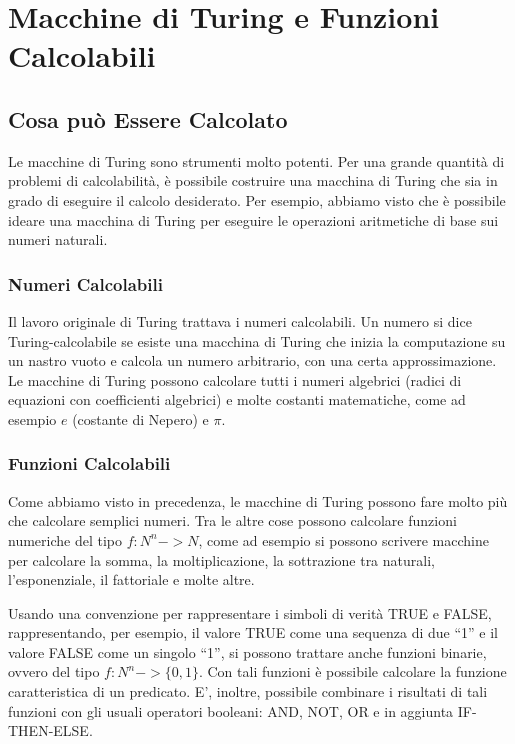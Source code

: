 \chapter{Macchine di Turing e Funzioni Calcolabili}

\section{Cosa pu\`o Essere Calcolato}

Le macchine di Turing sono strumenti molto potenti. Per una grande
quantit\`a di problemi di calcolabilit\`a, \`e possibile costruire una
macchina di Turing che sia in grado di eseguire il calcolo
desiderato. Per esempio, abbiamo visto che \`e possibile ideare una
macchina di Turing per eseguire le operazioni aritmetiche di base sui
numeri naturali.

\subsection{Numeri Calcolabili}

Il lavoro originale di Turing trattava i numeri calcolabili. Un numero
si dice Turing-calcolabile se esiste una macchina di Turing che inizia
la computazione su un nastro vuoto e calcola un numero arbitrario, con
una certa approssimazione. Le macchine di Turing possono calcolare
tutti i numeri algebrici (radici di equazioni con coefficienti
algebrici) e molte costanti matematiche, come ad esempio $\textit{e}$
(costante di Nepero) e $\pi$.

\subsection{Funzioni Calcolabili}

Come abbiamo visto in precedenza, le macchine di Turing possono fare
molto pi\`u che calcolare semplici numeri. Tra le altre cose possono
calcolare funzioni numeriche del tipo $f:N^{n}->N$, come ad esempio si
possono scrivere macchine per calcolare la somma, la moltiplicazione,
la sottrazione tra naturali, l'esponenziale, il fattoriale e molte
altre.

Usando una convenzione per rappresentare i simboli di verit\`a TRUE e
FALSE, rappresentando, per esempio, il valore TRUE come una sequenza
di due ``1'' e il valore FALSE come un singolo ``1'', si possono
trattare anche funzioni binarie, ovvero del tipo
$f:N^{n}->\{0,1\}$. Con tali funzioni \`e possibile calcolare la
funzione caratteristica di un predicato. E', inoltre, possibile
combinare i risultati di tali funzioni con gli usuali operatori
booleani: AND, NOT, OR e in aggiunta IF-THEN-ELSE.

